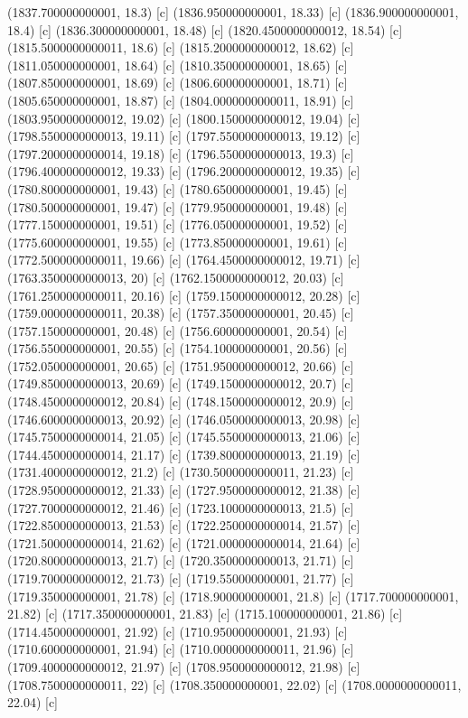 {{{(1837.700000000001, 18.3) [c] 
(1836.950000000001, 18.33) [c] 
(1836.900000000001, 18.4) [c] 
(1836.300000000001, 18.48) [c] 
(1820.4500000000012, 18.54) [c] 
(1815.5000000000011, 18.6) [c] 
(1815.2000000000012, 18.62) [c] 
(1811.050000000001, 18.64) [c] 
(1810.350000000001, 18.65) [c] 
(1807.850000000001, 18.69) [c] 
(1806.600000000001, 18.71) [c] 
(1805.650000000001, 18.87) [c] 
(1804.0000000000011, 18.91) [c] 
(1803.9500000000012, 19.02) [c] 
(1800.1500000000012, 19.04) [c] 
(1798.5500000000013, 19.11) [c] 
(1797.5500000000013, 19.12) [c] 
(1797.2000000000014, 19.18) [c] 
(1796.5500000000013, 19.3) [c] 
(1796.4000000000012, 19.33) [c] 
(1796.2000000000012, 19.35) [c] 
(1780.800000000001, 19.43) [c] 
(1780.650000000001, 19.45) [c] 
(1780.500000000001, 19.47) [c] 
(1779.950000000001, 19.48) [c] 
(1777.150000000001, 19.51) [c] 
(1776.050000000001, 19.52) [c] 
(1775.600000000001, 19.55) [c] 
(1773.850000000001, 19.61) [c] 
(1772.5000000000011, 19.66) [c] 
(1764.4500000000012, 19.71) [c] 
(1763.3500000000013, 20) [c] 
(1762.1500000000012, 20.03) [c] 
(1761.2500000000011, 20.16) [c] 
(1759.1500000000012, 20.28) [c] 
(1759.0000000000011, 20.38) [c] 
(1757.350000000001, 20.45) [c] 
(1757.150000000001, 20.48) [c] 
(1756.600000000001, 20.54) [c] 
(1756.550000000001, 20.55) [c] 
(1754.100000000001, 20.56) [c] 
(1752.050000000001, 20.65) [c] 
(1751.9500000000012, 20.66) [c] 
(1749.8500000000013, 20.69) [c] 
(1749.1500000000012, 20.7) [c] 
(1748.4500000000012, 20.84) [c] 
(1748.1500000000012, 20.9) [c] 
(1746.6000000000013, 20.92) [c] 
(1746.0500000000013, 20.98) [c] 
(1745.7500000000014, 21.05) [c] 
(1745.5500000000013, 21.06) [c] 
(1744.4500000000014, 21.17) [c] 
(1739.8000000000013, 21.19) [c] 
(1731.4000000000012, 21.2) [c] 
(1730.5000000000011, 21.23) [c] 
(1728.9500000000012, 21.33) [c] 
(1727.9500000000012, 21.38) [c] 
(1727.7000000000012, 21.46) [c] 
(1723.1000000000013, 21.5) [c] 
(1722.8500000000013, 21.53) [c] 
(1722.2500000000014, 21.57) [c] 
(1721.5000000000014, 21.62) [c] 
(1721.0000000000014, 21.64) [c] 
(1720.8000000000013, 21.7) [c] 
(1720.3500000000013, 21.71) [c] 
(1719.7000000000012, 21.73) [c] 
(1719.550000000001, 21.77) [c] 
(1719.350000000001, 21.78) [c] 
(1718.900000000001, 21.8) [c] 
(1717.700000000001, 21.82) [c] 
(1717.350000000001, 21.83) [c] 
(1715.100000000001, 21.86) [c] 
(1714.450000000001, 21.92) [c] 
(1710.950000000001, 21.93) [c] 
(1710.600000000001, 21.94) [c] 
(1710.0000000000011, 21.96) [c] 
(1709.4000000000012, 21.97) [c] 
(1708.9500000000012, 21.98) [c] 
(1708.7500000000011, 22) [c] 
(1708.350000000001, 22.02) [c] 
(1708.0000000000011, 22.04) [c] 
}}}
